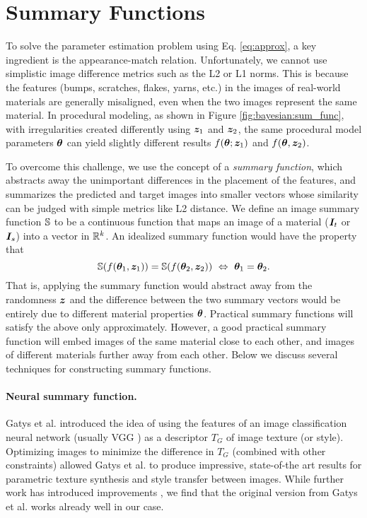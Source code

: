 \section{Summary Functions}
\label{sec:bayesian:summary}

To solve the parameter estimation problem using Eq. \eqref{eq:approx}, a key ingredient is the appearance-match relation.
Unfortunately, we cannot use simplistic image difference metrics such as the L2 or L1 norms.
This is because the features (bumps, scratches, flakes, yarns, etc.) in the images of real-world materials are generally misaligned, even when the two images represent the same material.
In procedural modeling, as shown in Figure \ref{fig:bayesian:sum_func}, with irregularities created differently using $\bm{z}_1$ and $\bm{z}_2$, the same procedural model parameters $\bm{\theta}$ can yield slightly different results $f(\bm{\theta}; \bm{z}_1)$ and $f(\bm{\theta}, \bm{z}_2)$.



To overcome this challenge, we use the concept of a \emph{summary function}, which abstracts away the unimportant differences in the placement of the features, and summarizes the predicted and target images into smaller vectors whose similarity can be judged with simple metrics like L2 distance.
We define an image summary function $\mathbb{S}$ to be a continuous function that maps an image of a material ($\bm{I}_t$ or $\bm{I}_s$) into a vector in $\mathbb{R}^k$. An idealized summary function would have the property that
\begin{equation}
	\mathbb{S}(f(\bm{\theta}_1, \bm{z}_1)) = \mathbb{S}(f(\bm{\theta}_2, \bm{z}_2)) \ \Leftrightarrow \ \bm{\theta}_1 = \bm{\theta}_2.
\end{equation}
That is, applying the summary function would abstract away from the randomness $\bm{z}$ and the difference between the two summary vectors would be entirely due to different material properties $\bm{\theta}$. Practical summary functions will satisfy the above only approximately. However, a good practical summary function will embed images of the same material close to each other, and images of different materials further away from each other. Below we discuss several techniques for constructing summary functions.

\paragraph{Neural summary function.}
Gatys et al. \cite{gatys2015neural,gatys2016image} introduced the idea of using the features of an image classification neural network (usually VGG \cite{simonyan2014very}) as a descriptor $T_G$ of image texture (or style). Optimizing images to minimize the difference in $T_G$ (combined with other constraints) allowed Gatys et al. to produce impressive, state-of-the art results for parametric texture synthesis and style transfer between images. While further work  has introduced improvements \cite{risser2017stable}, we find that the original version from Gatys et al. works already well in our case.

